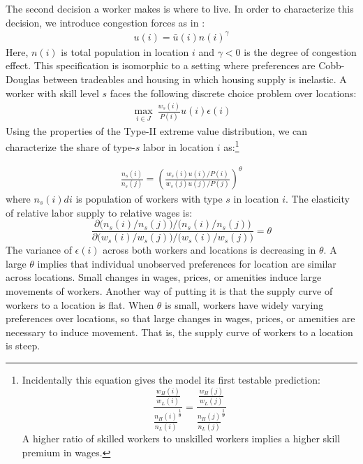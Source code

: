 \documentclass{article}
\begin{document}
The second decision a worker makes is where to live.  In order to characterize this decision, we introduce congestion forces as in \citet{allen2014trade}:
\begin{eqnarray}\label{eq:congestion}
u(i) = \bar{u}(i)  n(i)^{\gamma}
\end{eqnarray}
Here, $n(i)$ is total population in location $i$ and $\gamma<0$ is the degree of congestion effect. This specification is isomorphic to a setting where preferences are Cobb-Douglas between tradeables and housing in which housing supply is inelastic.
A worker with skill level $s$ faces the following discrete choice problem over locations:
\begin{eqnarray} 
\max_{i \in J}~ \frac{w_s(i)}{P(i)}u(i) \epsilon(i)  \nonumber
\end{eqnarray}
Using the properties of the Type-II extreme value distribution, we can characterize the share of type-$s$ labor in location $i$ as:\footnote{Incidentally this equation gives the model its first testable prediction:
    \begin{equation*}
        \frac{\frac{w_H(i)}{w_L(i)}}{\frac{n_H(i)}{n_L(i)}^\frac{1}{\theta}} = \frac{\frac{w_H(j)}{w_L(j)}}{\frac{n_H(j)}{n_L(j)}^\frac{1}{\theta}}
    \end{equation*}
    A higher ratio of skilled workers to unskilled workers implies a higher skill premium in wages.}
    

\begin{eqnarray}
    \frac{n_s(i)}{n_s(j)} = \left(
	\frac{w_s(i)u(i)/P(i)}
	{w_s(j)u(j) /P(j)}\right)^\theta
    \label{eq:rel_pops}
\end{eqnarray} 
where $n_s(i) di$ is population of workers with type $s$ in location $i$.
The elasticity of relative labor supply to relative wages is:
\[
\frac{ \partial \Big(n_s(i)/n_s(j)\Big) \Big/
\Big(n_s(i)/n_s(j)\Big)}
{\partial \Big(w_s(i)/w_s(j)\Big) \Big/
\Big(w_s(i)/w_s(j)\Big) } = \theta
\]
The variance of $\epsilon(i)$ across both workers and locations is decreasing in $\theta$. A large $\theta$ implies that individual unobserved preferences for location are similar across locations. Small changes in wages, prices, or amenities induce large movements of workers.  Another way of putting it is that the supply curve of workers to a location is flat.  When $\theta$ is small, workers have widely varying preferences over locations, so that large changes in wages, prices, or amenities are necessary to induce movement.  That is, the supply curve of workers to a location is steep.
\end{document}
